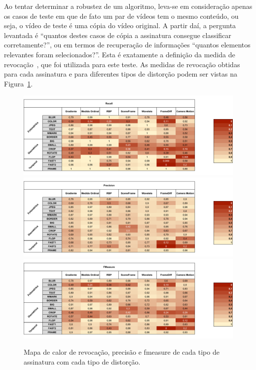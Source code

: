 Ao tentar determinar a robustez de um algoritmo, leva-se em consideração apenas os casos de teste em que de fato um par de vídeos tem o mesmo conteúdo, ou seja, o vídeo de teste é uma cópia do vídeo original. A partir daí, a pergunta levantada é ``quantos destes casos de cópia a assinatura consegue classificar corretamente?'', ou em termos de recuperação de informações ``quantos elementos relevantes foram selecionados?''. Esta é exatamente a definição da medida de revocação~\cite{Ting2010}, que foi utilizada para este teste. As medidas de revocação obtidas para cada assinatura e para diferentes tipos de distorção podem ser vistas na Figura~\ref{fig:heatmap-comparacoes}.


\begin{figure}[h]
	\centering
	\caption{Mapa de calor de revocação, precisão e fmeasure de cada tipo de assinatura com cada tipo de distorção.}
	\label{fig:heatmap-comparacoes}
	\includegraphics[width=\textwidth]{dados/figuras/experimentos/before_recall.pdf}
	\includegraphics[width=\textwidth]{dados/figuras/experimentos/before_precision.pdf}
	\includegraphics[width=\textwidth]{dados/figuras/experimentos/before_fmeasure.pdf}	
\end{figure}

